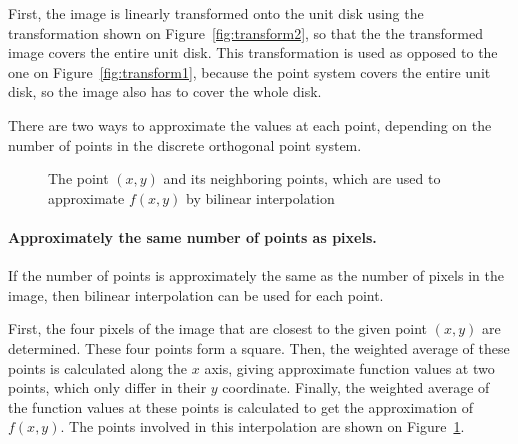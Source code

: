 First, the image is linearly transformed onto the unit disk using the transformation shown on Figure~\ref{fig:transform2}, so that the the transformed image covers the entire unit disk. This transformation is used as opposed to the one on Figure~\ref{fig:transform1}, because the point system covers the entire unit disk, so the image also has to cover the whole disk.

There are two ways to approximate the values at each point, depending on the number of points in the discrete orthogonal point system.

\begin{figure}[tb]
    \centering

    \caption{The point $(x,y)$ and its neighboring points, which are used to approximate $f(x,y)$ by bilinear interpolation}
    \label{fig:bilinear}
\end{figure}

\paragraph{Approximately the same number of points as pixels.}
If the number of points is approximately the same as the number of pixels in the image, then bilinear interpolation can be used for each point.

First, the four pixels of the image that are closest to the given point $(x,y)$ are determined. These four points form a square. Then, the weighted average of these points is calculated along the $x$ axis, giving approximate function values at two points, which only differ in their $y$ coordinate. Finally, the weighted average of the function values at these points is calculated to get the approximation of $f(x,y)$. The points involved in this interpolation are shown on Figure~\ref{fig:bilinear}.



